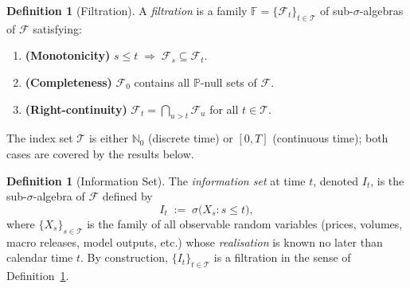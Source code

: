 \documentclass[12pt,openany]{book}
\newcommand{\calI}{\mathcal{I}}
\numberwithin{equation}{chapter}
\theoremstyle{plain}
\theoremstyle{definition}
\newtheorem{definition}[theorem]{Definition}
\theoremstyle{remark}
\numberwithin{equation}{chapter}
\theoremstyle{plain}
\def\calI{I}%
\begin{document}
\begin{definition}[Filtration]
\label{def:filtration}
A \emph{filtration} is a family
$\mathbb{F} = \{\mathcal{F}_t\}_{t \in \mathcal{T}}$
of sub-$\sigma$-algebras of $\mathcal{F}$ satisfying:
\begin{enumerate}
  \item \textbf{(Monotonicity)}
        $s \leq t \;\Rightarrow\; \mathcal{F}_s \subseteq \mathcal{F}_t$.
  \item \textbf{(Completeness)}
        $\mathcal{F}_0$ contains all $\mathbb{P}$-null sets of
        $\mathcal{F}$.
  \item \textbf{(Right-continuity)}
        $\mathcal{F}_t = \bigcap_{u > t} \mathcal{F}_u$ for all
        $t \in \mathcal{T}$.
\end{enumerate}
The index set $\mathcal{T}$ is either $\mathbb{N}_0$ (discrete time)
or $[0,T]$ (continuous time); both cases are covered by the results
below.
\end{definition}

\begin{definition}[Information Set]
\label{def:info-set}
The \emph{information set} at time $t$, denoted $\calI_t$, is the
sub-$\sigma$-algebra of $\mathcal{F}$ defined by
\begin{equation}
  \calI_t \;:=\; \sigma\!\bigl(X_s : s \leq t\bigr),
  \label{eq:info-set}
\end{equation}
where $\{X_s\}_{s \in \mathcal{T}}$ is the family of all observable
random variables (prices, volumes, macro releases, model outputs,
etc.) whose \emph{realisation} is known no later than calendar time
$t$.  By construction, $\{\calI_t\}_{t \in \mathcal{T}}$ is a
filtration in the sense of Definition~\ref{def:filtration}.
\end{definition}
\end{document}
